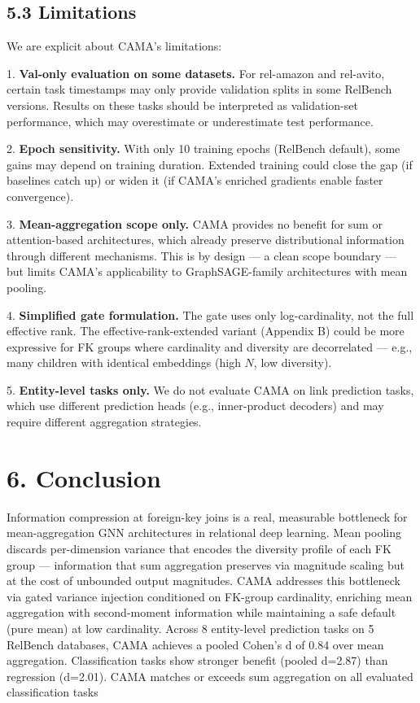 \documentclass[final]{article}
\begin{document}
\subsection{5.3 Limitations}

We are explicit about CAMA's limitations:

1. \textbf{Val-only evaluation on some datasets.} For rel-amazon and rel-avito, certain task timestamps may only provide validation splits in some RelBench versions. Results on these tasks should be interpreted as validation-set performance, which may overestimate or underestimate test performance.

2. \textbf{Epoch sensitivity.} With only 10 training epochs (RelBench default), some gains may depend on training duration. Extended training could close the gap (if baselines catch up) or widen it (if CAMA's enriched gradients enable faster convergence).

3. \textbf{Mean-aggregation scope only.} CAMA provides no benefit for sum or attention-based architectures, which already preserve distributional information through different mechanisms. This is by design --- a clean scope boundary --- but limits CAMA's applicability to GraphSAGE-family architectures with mean pooling.

4. \textbf{Simplified gate formulation.} The gate uses only log-cardinality, not the full effective rank. The effective-rank-extended variant (Appendix B) could be more expressive for FK groups where cardinality and diversity are decorrelated --- e.g., many children with identical embeddings (high $N$, low diversity).

5. \textbf{Entity-level tasks only.} We do not evaluate CAMA on link prediction tasks, which use different prediction heads (e.g., inner-product decoders) and may require different aggregation strategies.


\section{6. Conclusion}

Information compression at foreign-key joins is a real, measurable bottleneck for mean-aggregation GNN architectures in relational deep learning. Mean pooling discards per-dimension variance that encodes the diversity profile of each FK group --- information that sum aggregation preserves via magnitude scaling but at the cost of unbounded output magnitudes. CAMA addresses this bottleneck via gated variance injection conditioned on FK-group cardinality, enriching mean aggregation with second-moment information while maintaining a safe default (pure mean) at low cardinality. Across 8 entity-level prediction tasks on 5 RelBench databases, CAMA achieves a pooled Cohen's d of 0.84 over mean aggregation. Classification tasks show stronger benefit (pooled d=2.87) than regression (d=2.01). CAMA matches or exceeds sum aggregation on all evaluated classification tasks
\end{document}
